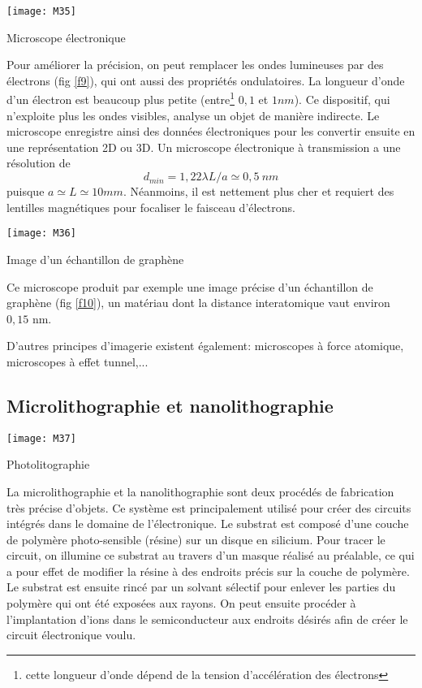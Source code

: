 \begin{marginfigure}[-1cm]
\texttt{[image: M35]}
\caption{Microscope électronique}
\label{f9}
\end{marginfigure}

Pour améliorer la précision, on peut remplacer les ondes lumineuses par des électrons (fig \ref{f9}), qui ont aussi des propriétés ondulatoires. La longueur d'onde d'un électron est beaucoup plus petite (entre\footnote{cette longueur d'onde dépend de la tension d'accélération des électrons} $0,1$ et $1nm$). Ce dispositif, qui n'exploite plus les ondes visibles, analyse un objet de manière indirecte. Le microscope enregistre ainsi des données électroniques pour les convertir ensuite en une représentation 2D ou 3D. Un microscope électronique à transmission a une résolution de $$d_{min}=1,22\lambda L/a\simeq0,5\:nm$$ puisque $a\simeq L\simeq10mm$.
Néanmoins, il est nettement plus cher et requiert des lentilles magnétiques pour focaliser le faisceau d'électrons.

\begin{marginfigure}[0cm]
\texttt{[image: M36]}
\caption{Image d'un échantillon de graphène}
\label{f10}
\end{marginfigure}

\noindent Ce microscope produit par exemple une image précise d'un échantillon de graphène (fig \ref{f10}), un matériau dont la distance interatomique vaut environ $0,15$ nm.

\noindent D'autres principes d'imagerie existent également: microscopes à force atomique, microscopes à effet tunnel,...

\subsection{Microlithographie et nanolithographie}

\begin{marginfigure}[0cm]
\texttt{[image: M37]}
\caption{Photolitographie}
\label{f11}
\end{marginfigure}

La microlithographie et la nanolithographie sont deux procédés de fabrication très précise d'objets. Ce système est principalement utilisé pour créer des circuits intégrés dans le domaine de l'électronique. Le substrat est composé d'une couche de polymère photo-sensible (résine) sur un disque en silicium. Pour tracer le circuit, on illumine ce substrat au travers d'un masque réalisé au préalable, ce qui a pour effet de modifier la résine à des endroits précis sur la couche de polymère. Le substrat est ensuite rincé par un solvant sélectif pour enlever les parties du polymère qui ont été exposées aux rayons. On peut ensuite procéder à l'implantation d'ions dans le semiconducteur aux endroits désirés afin de créer le circuit électronique voulu. 

